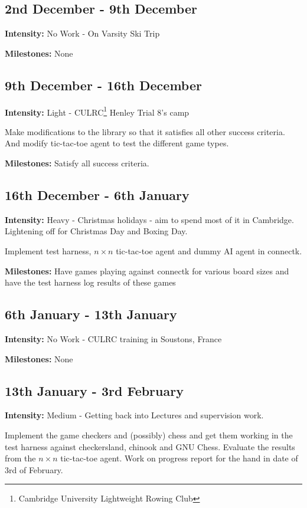 \documentclass[12pt]{article}
\begin{document}
\subsection*{2nd December - 9th December}
{\bf Intensity:} No Work - On Varsity Ski Trip\par
{\bf Milestones:} None

\subsection*{9th December - 16th December}
{\bf Intensity:} Light - CULRC\footnote{Cambridge University Lightweight Rowing Club} Henley Trial 8's camp\par
Make modifications to the library so that it satisfies all other success criteria. And modify tic-tac-toe agent to test the different game types.\par
{\bf Milestones:} Satisfy all success criteria.


\subsection*{16th December - 6th January}
{\bf Intensity:} Heavy - Christmas holidays - aim to spend most of it in Cambridge. Lightening off for Christmas Day and Boxing Day.\par


Implement test harness, $n\times n$ tic-tac-toe agent and dummy AI agent in connectk.\par
{\bf Milestones:} Have games playing against connectk for various board sizes and have the test harness log results of these games



\subsection*{6th January - 13th January}
{\bf Intensity:} No Work - CULRC training in Soustons, France\par
{\bf Milestones:} None

\subsection*{13th January - 3rd February}
{\bf Intensity:} Medium - Getting back into Lectures and supervision work.\par
Implement the game checkers and (possibly) chess and get them working in the test harness against checkersland, chinook and GNU Chess. Evaluate the results from the $n\times n$ tic-tac-toe agent.
 Work on progress report for the hand in date of 3rd of February.
 
\end{document}
